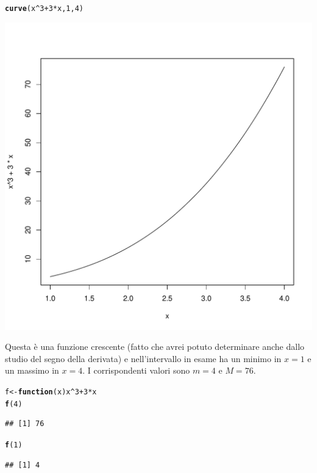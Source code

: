 \documentclass[onecolumn,11pt]{book}\usepackage[]{graphicx}\usepackage[]{color}
\makeatletter
\def\maxwidth{ %
  \ifdim\Gin@nat@width>\linewidth
    \linewidth
  \else
    \Gin@nat@width
  \fi
}
\newcommand{\hlnum}[1]{\textcolor[rgb]{0.686,0.059,0.569}{#1}}%
\newcommand{\hlopt}[1]{\textcolor[rgb]{0,0,0}{#1}}%
\newcommand{\hlstd}[1]{\textcolor[rgb]{0.345,0.345,0.345}{#1}}%
\newcommand{\hlkwa}[1]{\textcolor[rgb]{0.161,0.373,0.58}{\textbf{#1}}}%
\newcommand{\hlkwb}[1]{\textcolor[rgb]{0.69,0.353,0.396}{#1}}%
\newcommand{\hlkwc}[1]{\textcolor[rgb]{0.333,0.667,0.333}{#1}}%
\newcommand{\hlkwd}[1]{\textcolor[rgb]{0.737,0.353,0.396}{\textbf{#1}}}%
\newenvironment{kframe}{%
 \def\at@end@of@kframe{}%
 \ifinner\ifhmode%
  \def\at@end@of@kframe{\end{minipage}}%
  \begin{minipage}{\columnwidth}%
 \fi\fi%
 \def\FrameCommand##1{\hskip\@totalleftmargin \hskip-\fboxsep
 \colorbox{shadecolor}{##1}\hskip-\fboxsep
     \hskip-\linewidth \hskip-\@totalleftmargin \hskip\columnwidth}%
 \MakeFramed {\advance\hsize-\width
   \@totalleftmargin\z@ \linewidth\hsize
   \@setminipage}}%
 {\par\unskip\endMakeFramed%
 \at@end@of@kframe}
\newenvironment{knitrout}{}{} %
\makeatother
\begin{document}
\begin{knitrout}
\color{fgcolor}\begin{kframe}
\begin{alltt}
\hlkwd{curve}\hlstd{(x}\hlopt{^}\hlnum{3}\hlopt{+}\hlnum{3}\hlopt{*}\hlstd{x,}\hlnum{1}\hlstd{,}\hlnum{4}\hlstd{)}
\end{alltt}
\end{kframe}
\includegraphics[width=\maxwidth]{figure/unnamed-chunk-147-1} 

\end{knitrout}
Questa \`e una funzione crescente (fatto che avrei potuto determinare anche dallo studio del segno della derivata) e nell'intervallo in esame ha un minimo  in $x=1$ e un massimo in $x=4$. I corrispondenti valori sono $m=4$ e $M=76$.
\begin{knitrout}
\color{fgcolor}\begin{kframe}
\begin{alltt}
\hlstd{f}\hlkwb{<-}\hlkwa{function}\hlstd{(}\hlkwc{x}\hlstd{) x}\hlopt{^}\hlnum{3}\hlopt{+}\hlnum{3}\hlopt{*}\hlstd{x}
\hlkwd{f}\hlstd{(}\hlnum{4}\hlstd{)}
\end{alltt}
\begin{verbatim}
## [1] 76
\end{verbatim}
\begin{alltt}
\hlkwd{f}\hlstd{(}\hlnum{1}\hlstd{)}
\end{alltt}
\begin{verbatim}
## [1] 4
\end{verbatim}
\end{kframe}
\end{knitrout}
\end{document}
